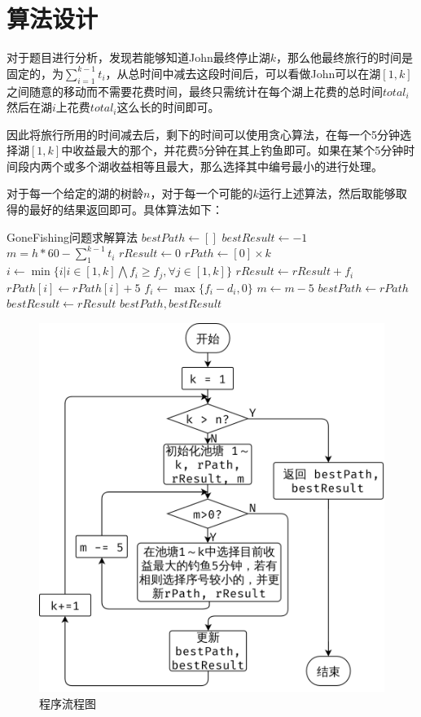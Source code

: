 \documentclass{report}
\begin{document}
\section{算法设计}
\label{sec:suan_fa_she_ji_6}
对于题目进行分析，发现若能够知道John最终停止湖$k$，那么他最终旅行的时间是固定的，为$\sum_{i=1}^{k-1}t_i$，从总时间中减去这段时间后，可以看做John可以在湖$[1, k]$之间随意的移动而不需要花费时间，最终只需统计在每个湖上花费的总时间$total_i$然后在湖$i$上花费$total_i$这么长的时间即可。\par
因此将旅行所用的时间减去后，剩下的时间可以使用贪心算法，在每一个5分钟选择湖$[1, k]$中收益最大的那个，并花费5分钟在其上钓鱼即可。如果在某个5分钟时间段内两个或多个湖收益相等且最大，那么选择其中编号最小的进行处理。\par
对于每一个给定的湖的树龄$n$，对于每一个可能的$k$运行上述算法，然后取能够取得的最好的结果返回即可。具体算法如下：\par
\begin{simpleAlgorithm}{GoneFishing问题求解算法}
     
    \State $bestPath \gets []$
    \State $bestResult \gets -1$
        \State $m = h * 60 - \sum_{1}^{k-1}t_i$  
        \State $rResult \gets 0$ 
        \State $rPath \gets [0]\times k$
        \State $i \gets \min\{i | i \in [1,k] \bigwedge f_i \geq f_j, \forall j \in [1,k] \}$
            \State $rResult \gets rResult + f_i$
            \State $rPath[i] \gets rPath[i] + 5$
            \State $f_i \gets \max\{f_i - d_i, 0\}$
            \State $m \gets m-5$
        \EndWhile
            \State $bestPath \gets rPath$
            \State $bestResult \gets rResult$
        \EndIf
    \EndFor
    \State \Return $bestPath, bestResult$
    \EndProcedure
\end{simpleAlgorithm}

\begin{figure}[ht]
    \centering
    \includegraphics[width=0.42\linewidth]{flowchart6.png}
    \caption{程序流程图}
    \label{fig:flowchart6}
\end{figure}
\end{document}
